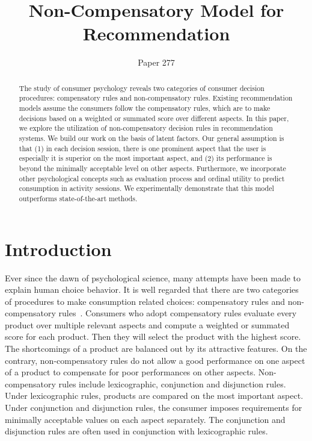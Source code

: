 \documentclass[sigconf]{acmart}
\begin{document}
\title{Non-Compensatory Model for Recommendation}


\author{Paper 277}


\begin{abstract}
The study of consumer psychology reveals two categories of consumer decision procedures: compensatory rules and non-compensatory rules. Existing recommendation models assume the consumers follow the compensatory rules, which are to make decisions based on a weighted or summated score over different aspects. In this paper, we explore the utilization of non-compensatory decision rules in recommendation systems. We build our work on the basis of latent factors. Our general assumption is that (1) in each decision session, there is one prominent aspect that the user is especially it is superior on the most important aspect, and (2) its performance is beyond the minimally acceptable level on other aspects. Furthermore, we incorporate other psychological concepts such as evaluation process and ordinal utility to predict consumption in activity sessions. We experimentally demonstrate that this model outperforms state-of-the-art methods.
\end{abstract}




\maketitle
\section{Introduction}\label{sec:introduction}


Ever since the dawn of psychological science, many attempts have been made to explain human choice behavior. It is well regarded that there are two categories of procedures to make consumption related choices: compensatory rules and non-compensatory rules~\cite{Engel1986Consumer}. Consumers who adopt compensatory rules evaluate every product over multiple relevant aspects and compute a weighted or summated score for each product. Then they will select the product with the highest score. The shortcomings of a product are balanced out by its attractive features. On the contrary, non-compensatory rules do not allow a good performance on one aspect of a product to compensate for poor performances on other aspects. Non-compensatory rules include lexicographic, conjunction and disjunction rules. Under lexicographic rules, products are compared on the most important aspect. Under conjunction and disjunction rules, the consumer imposes requirements for minimally acceptable values on each aspect separately. The conjunction and disjunction rules are often used in conjunction with lexicographic rules.
\end{document}
